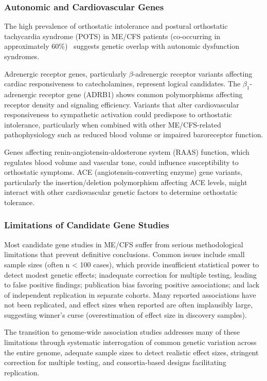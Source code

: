\subsubsection{Autonomic and Cardiovascular Genes}

The high prevalence of orthostatic intolerance and postural orthostatic tachycardia syndrome (POTS) in ME/CFS patients (co-occurring in approximately 60\%)~\cite{Natelson2022} suggests genetic overlap with autonomic dysfunction syndromes.

Adrenergic receptor genes, particularly $\beta$-adrenergic receptor variants affecting cardiac responsiveness to catecholamines, represent logical candidates. The $\beta_1$-adrenergic receptor gene (ADRB1) shows common polymorphisms affecting receptor density and signaling efficiency. Variants that alter cardiovascular responsiveness to sympathetic activation could predispose to orthostatic intolerance, particularly when combined with other ME/CFS-related pathophysiology such as reduced blood volume or impaired baroreceptor function.

Genes affecting renin-angiotensin-aldosterone system (RAAS) function, which regulates blood volume and vascular tone, could influence susceptibility to orthostatic symptoms. ACE (angiotensin-converting enzyme) gene variants, particularly the insertion/deletion polymorphism affecting ACE levels, might interact with other cardiovascular genetic factors to determine orthostatic tolerance.

\subsubsection{Limitations of Candidate Gene Studies}

\begin{warning}
Most candidate gene studies in ME/CFS suffer from serious methodological limitations that prevent definitive conclusions. Common issues include small sample sizes (often n < 100 cases), which provide insufficient statistical power to detect modest genetic effects; inadequate correction for multiple testing, leading to false positive findings; publication bias favoring positive associations; and lack of independent replication in separate cohorts. Many reported associations have not been replicated, and effect sizes when reported are often implausibly large, suggesting winner's curse (overestimation of effect size in discovery samples).

The transition to genome-wide association studies addresses many of these limitations through systematic interrogation of common genetic variation across the entire genome, adequate sample sizes to detect realistic effect sizes, stringent correction for multiple testing, and consortia-based designs facilitating replication.
\end{warning}

